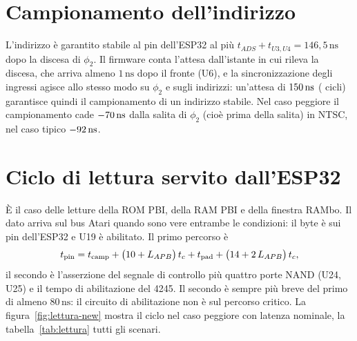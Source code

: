 \documentclass[11pt,a4paper,twoside,openright]{report}
\newcommand{\ns}{\,\mathrm{ns}}
\begin{document}
\section{Campionamento dell'indirizzo}

L'indirizzo è garantito stabile al pin dell'ESP32 al più $t_{ADS} + t_{U3,U4} =
146{,}5\ns$ dopo la discesa di $\phi_2$. Il firmware conta l'attesa dall'istante in cui
rileva la discesa, che arriva almeno $1\ns$ dopo il fronte (U6), e la sincronizzazione degli
ingressi agisce allo stesso modo su $\phi_2$ e sugli indirizzi: un'attesa di
$\SettleNs\ns$ (\SettleCyc{} cicli) garantisce quindi il campionamento di un indirizzo
stabile. Nel caso peggiore il campionamento cade $\NwSampleNTSC\ns$ dalla salita di $\phi_2$
(cioè prima della salita) in NTSC, nel caso tipico $\NwSampleTNTSC\ns$.

\section{Ciclo di lettura servito dall'ESP32}
\label{sec:lettura-esp}

È il caso delle letture della ROM PBI, della RAM PBI e della finestra RAMbo. Il dato arriva
sul bus Atari quando sono vere entrambe le condizioni: il byte è sui pin dell'ESP32 e U19 è
abilitato. Il primo percorso è
\begin{equation}
  t_{\text{pin}} = t_{\text{camp}} + \big(10 + L_{APB}\big)\,t_c + t_{\text{pad}} + \big(14 + 2\,L_{APB}\big)\,t_c,
\end{equation}
il secondo è l'asserzione del segnale di controllo più quattro porte NAND (U24, U25) e il
tempo di abilitazione del 4245. Il secondo è sempre più breve del primo di almeno $80\ns$: il circuito
di abilitazione non è sul percorso critico. La figura~\ref{fig:lettura-new} mostra il ciclo
nel caso peggiore con latenza nominale, la tabella~\ref{tab:lettura} tutti gli scenari.
\end{document}
